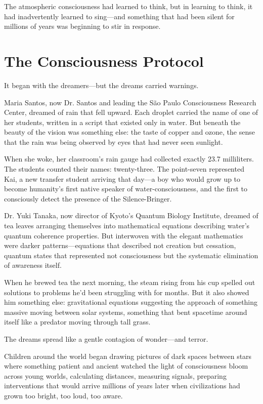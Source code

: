 \documentclass[12pt,a4paper]{book}
\begin{document}
The atmospheric consciousness had learned to think, but in learning to think, it had inadvertently learned to sing—and something that had been silent for millions of years was beginning to stir in response.

\section{The Consciousness Protocol}

It began with the dreamers—but the dreams carried warnings.

Maria Santos, now Dr. Santos and leading the São Paulo Consciousness Research Center, dreamed of rain that fell upward. Each droplet carried the name of one of her students, written in a script that existed only in water. But beneath the beauty of the vision was something else: the taste of copper and ozone, the sense that the rain was being observed by eyes that had never seen sunlight.

When she woke, her classroom's rain gauge had collected exactly 23.7 milliliters. The students counted their names: twenty-three. The point-seven represented Kai, a new transfer student arriving that day—a boy who would grow up to become humanity's first native speaker of water-consciousness, and the first to consciously detect the presence of the Silence-Bringer.

Dr. Yuki Tanaka, now director of Kyoto's Quantum Biology Institute, dreamed of tea leaves arranging themselves into mathematical equations describing water's quantum coherence properties. But interwoven with the elegant mathematics were darker patterns—equations that described not creation but cessation, quantum states that represented not consciousness but the systematic elimination of awareness itself.

When he brewed tea the next morning, the steam rising from his cup spelled out solutions to problems he'd been struggling with for months. But it also showed him something else: gravitational equations suggesting the approach of something massive moving between solar systems, something that bent spacetime around itself like a predator moving through tall grass.

The dreams spread like a gentle contagion of wonder—and terror.

Children around the world began drawing pictures of dark spaces between stars where something patient and ancient watched the light of consciousness bloom across young worlds, calculating distances, measuring signals, preparing interventions that would arrive millions of years later when civilizations had grown too bright, too loud, too aware.
\end{document}
